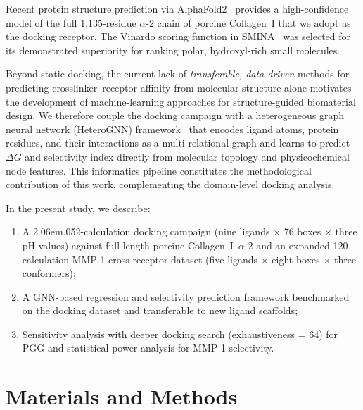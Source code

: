 \documentclass[11pt]{article}
\begin{document}
Recent protein structure prediction via AlphaFold2~\cite{jumper2021alphafold}
provides a high-confidence model of the full 1{,}135-residue $\alpha$-2
chain of porcine Collagen~I that we adopt as the docking receptor.
The Vinardo
scoring function in SMINA~\cite{koes2013lessons,quiroga2016vinardo} was
selected for its demonstrated superiority for ranking polar, hydroxyl-rich
small molecules.

Beyond static docking, the current lack of \emph{transferable, data-driven}
methods for predicting crosslinker--receptor affinity from molecular structure
alone motivates the development of machine-learning approaches for
structure-guided biomaterial design.
We therefore couple the docking campaign with a heterogeneous graph neural
network (HeteroGNN) framework~\cite{gilmer2017mpnn,schutt2018schnet} that
encodes ligand atoms, protein residues, and their interactions as a
multi-relational graph and learns to predict $\Delta G$ and selectivity
index directly from molecular topology and physicochemical node features.
This informatics pipeline constitutes the methodological contribution of
this work, complementing the domain-level docking analysis.

In the present study, we describe:
\begin{enumerate}
  \item A 2\kern .06em,052-calculation docking campaign
        (nine ligands $\times$ 76 boxes $\times$ three pH values)
        against full-length porcine Collagen~I~$\alpha$-2 and an
        expanded 120-calculation MMP-1 cross-receptor dataset
        (five ligands $\times$ eight boxes $\times$ three conformers);
  \item A GNN-based regression and selectivity prediction framework
        benchmarked on the docking dataset and transferable to
        new ligand scaffolds;
  \item Sensitivity analysis with deeper docking search
        (exhaustiveness = 64) for PGG and statistical power
        analysis for MMP-1 selectivity.
\end{enumerate}


\section{Materials and Methods}
\label{sec:methods}
\end{document}
